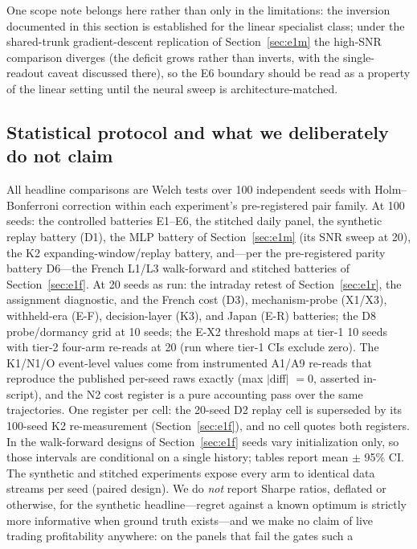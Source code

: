 \documentclass{article}
\begin{document}
One scope note belongs here rather than only in the limitations: the inversion documented in this section is established for the linear specialist class; under the shared-trunk gradient-descent replication of Section~\ref{sec:e1m} the high-SNR comparison diverges (the deficit grows rather than inverts, with the single-readout caveat discussed there), so the E6 boundary should be read as a property of the linear setting until the neural sweep is architecture-matched.


\subsection{Statistical protocol and what we deliberately do not claim}
\label{sec:stats}

All headline comparisons are Welch tests over 100 independent seeds with
Holm--Bonferroni correction within each experiment's pre-registered pair
family. At 100 seeds: the controlled batteries E1--E6, the stitched
daily panel, the synthetic replay battery (D1), the MLP battery of
Section~\ref{sec:e1m} (its SNR sweep at 20), the K2
expanding-window/replay battery, and---per the
pre-registered parity battery D6---the French L1/L3 walk-forward and
stitched batteries of Section~\ref{sec:e1f}. At 20 seeds as run: the
intraday retest of Section~\ref{sec:e1r}, the assignment diagnostic,
and the French cost (D3), mechanism-probe (X1/X3), withheld-era
(E-F), decision-layer (K3), and Japan (E-R) batteries; the D8
probe/dormancy grid at 10 seeds; the E-X2 threshold maps at tier-1
10 seeds with tier-2 four-arm re-reads at 20 (run where tier-1 CIs
exclude zero). The K1/N1/O event-level values come from instrumented
A1/A9 re-reads that reproduce the published per-seed raws exactly
(max $|$diff$|$ $= 0$, asserted in-script), and the N2 cost register
is a pure accounting pass over the same trajectories. One register
per cell: the 20-seed
D2 replay cell is superseded by its 100-seed K2 re-measurement
(Section~\ref{sec:e1f}), and no cell quotes both registers. In the walk-forward designs of
Section~\ref{sec:e1f} seeds vary initialization only, so those
intervals are conditional on a single history; tables report mean
$\pm$ 95\% CI. The synthetic and stitched
experiments expose every arm to identical data streams per seed (paired
design). We do \emph{not} report Sharpe ratios, deflated or otherwise, for
the synthetic headline---regret against a known optimum is strictly more
informative when ground truth exists---and we make no claim of live
trading profitability anywhere: on the panels that fail the gates such a
\end{document}
